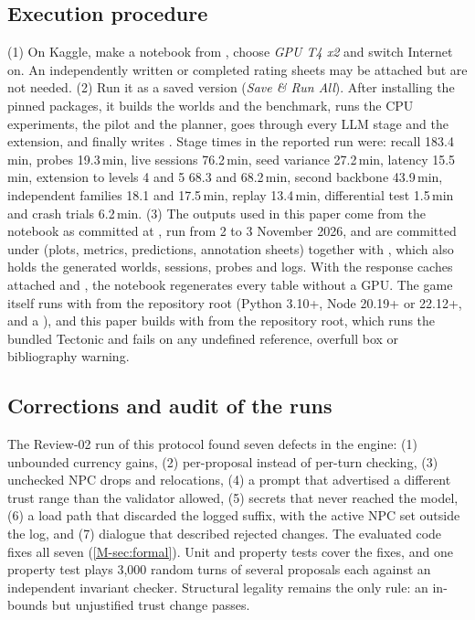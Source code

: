 \documentclass[letterpaper,journal,onecolumn]{IEEEtran}
\begin{document}
\subsection{Execution procedure}
(1) On Kaggle, make a notebook from , choose \emph{GPU T4 x2} and switch Internet on. An independently written  or completed rating sheets may be attached but are not needed. (2) Run it as a saved version (\emph{Save \& Run All}). After installing the pinned packages, it builds the worlds and the benchmark, runs the CPU experiments, the pilot and the planner, goes through every LLM stage and the extension, and finally writes . Stage times in the reported run were: recall 183.4\,min, probes 19.3\,min, live sessions 76.2\,min, seed variance 27.2\,min, latency 15.5\,min, extension to levels 4 and 5 68.3 and 68.2\,min, second backbone 43.9\,min, independent families 18.1 and 17.5\,min, replay 13.4\,min, differential test 1.5\,min and crash trials 6.2\,min. (3) The outputs used in this paper come from the notebook as committed at , run from 2 to 3 November 2026, and are committed under  (plots, metrics, predictions, annotation sheets) together with , which also holds the generated worlds, sessions, probes and logs. With the response caches attached and , the notebook regenerates every table without a GPU. The game itself runs with  from the repository root (Python 3.10+, Node 20.19+ or 22.12+, and a ), and this paper builds with  from the repository root, which runs the bundled Tectonic and fails on any undefined reference, overfull box or bibliography warning.

\subsection{Corrections and audit of the runs}\label{sec:gaps}
The Review-02 run of this protocol found seven defects in the engine: (1) unbounded currency gains, (2) per-proposal instead of per-turn checking, (3) unchecked NPC drops and relocations, (4) a prompt that advertised a different trust range than the validator allowed, (5) secrets that never reached the model, (6) a load path that discarded the logged suffix, with the active NPC set outside the log, and (7) dialogue that described rejected changes. The evaluated code fixes all seven (\cref{M-sec:formal}). Unit and property tests cover the fixes, and one property test plays 3{,}000 random turns of several proposals each against an independent invariant checker. Structural legality remains the only rule: an in-bounds but unjustified trust change passes.
\end{document}
